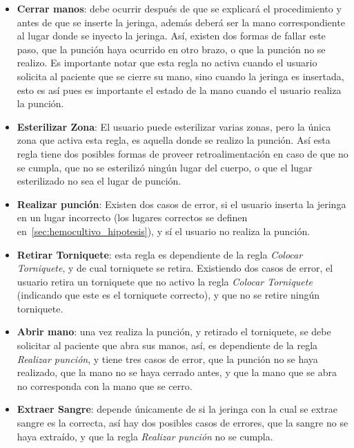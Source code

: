 \begin{itemize}
\item \textbf{Cerrar manos}: debe ocurrir después de que se explicará el
    procedimiento y antes de que se inserte la jeringa, además deberá ser la
    mano correspondiente al lugar donde se inyecto la jeringa. Así, existen dos
    formas de fallar este paso, que la punción haya ocurrido en otro brazo, o
    que la punción no se realizo. Es importante notar que esta regla no activa
    cuando el usuario solicita al paciente que se cierre su mano, sino cuando la
    jeringa es insertada, esto es así pues es importante el estado de la mano
    cuando el usuario realiza la punción.

\item \textbf{Esterilizar Zona}: El usuario puede esterilizar varias zonas, pero
    la única zona que activa esta regla, es aquella donde se realizo la punción.
    Así esta regla tiene dos posibles formas de proveer retroalimentación en
    caso de que no se cumpla, que no se esterilizó ningún lugar del cuerpo, o
    que el lugar esterilizado no sea el lugar de punción.

\item \textbf{Realizar punción}: Existen dos casos de error, si el usuario
    inserta la jeringa en un lugar incorrecto (los lugares correctos se definen
    en~\ref{sec:hemocultivo_hipotesis}), y sí el usuario no realiza la punción.

\item \textbf{Retirar Torniquete}: esta regla es dependiente de la regla
    \emph{Colocar Torniquete}, y de cual torniquete se retira. Existiendo dos
    casos de error, el usuario retira un torniquete que no activo la regla
    \emph{Colocar Torniquete} (indicando que este es el torniquete correcto), y
    que no se retire ningún torniquete.

\item \textbf{Abrir mano}: una vez realiza la punción, y retirado el torniquete,
    se debe solicitar al paciente que abra sus manos, así, es dependiente de la
    regla \emph{Realizar punción}, y tiene tres casos de error, que la punción
    no se haya realizado, que la mano no se haya cerrado antes, y que la mano
    que se abra no corresponda con la mano que se cerro.

\item \textbf{Extraer Sangre}: depende únicamente de si la jeringa con la cual
    se extrae sangre es la correcta, así hay dos posibles casos de errores, que
    la sangre no se haya extraído, y que la regla \emph{Realizar punción} no se
    cumpla.


\end{itemize}

